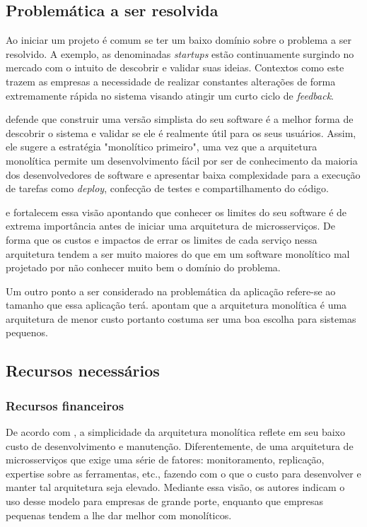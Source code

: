 \subsection{Problemática a ser resolvida}
\label{Perpectivas:Problematica}

Ao iniciar um projeto é comum se ter um baixo domínio sobre o problema a ser resolvido. A exemplo,
as denominadas \textit{startups} estão continuamente surgindo no mercado com o intuito de descobrir
e validar suas ideias. Contextos como este trazem as empresas a necessidade de realizar constantes
alterações de forma extremamente rápida no sistema visando atingir um curto ciclo de
\textit{feedback}.

 defende que construir uma versão simplista do seu software é
a melhor forma de descobrir o sistema e validar se ele é realmente útil para os seus usuários.
Assim, ele sugere a estratégia "monolítico primeiro", uma vez que a arquitetura monolítica permite
um desenvolvimento fácil por ser de conhecimento da maioria dos desenvolvedores de software e
apresentar baixa complexidade para a execução de tarefas como \textit{deploy}, confecção de testes
e compartilhamento do código.

 e  fortalecem essa visão apontando
que conhecer os limites do seu software é de extrema importância antes de iniciar uma arquitetura de
microsserviços. De forma que os custos e impactos de errar os limites de cada serviço nessa arquitetura
tendem a ser muito maiores do que em um software monolítico mal projetado por não conhecer muito bem o
domínio do problema. 

Um outro ponto a ser considerado na problemática da aplicação refere-se ao tamanho que essa
aplicação terá.  apontam que a arquitetura
monolítica é uma arquitetura de menor custo portanto costuma ser uma boa escolha para sistemas
pequenos.

\subsection{Recursos necessários}

\subsubsection{Recursos financeiros}

De acordo com , a simplicidade da arquitetura
monolítica reflete em seu baixo custo de desenvolvimento e manutenção. Diferentemente, de uma arquitetura
de microsserviços que exige uma série de fatores: monitoramento, replicação, expertise sobre as
ferramentas, etc., fazendo com o que o custo para desenvolver e manter tal arquitetura seja elevado.
Mediante essa visão, os autores indicam o uso desse modelo para empresas de grande porte,
enquanto que empresas pequenas tendem a lhe dar melhor com monolíticos.

